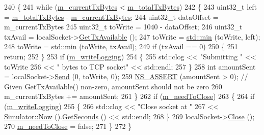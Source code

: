 \begin{DoxyCode}
240 \{
241   \textcolor{keywordflow}{while} (\hyperlink{classNs3TcpLossTestCase_a3ddd820ce273cb02ec0d500da76a88e2}{m\_currentTxBytes} < \hyperlink{classNs3TcpLossTestCase_ac06e95861fbb4ed79486d76a752a83d9}{m\_totalTxBytes})
242     \{
243       uint32\_t left = \hyperlink{classNs3TcpLossTestCase_ac06e95861fbb4ed79486d76a752a83d9}{m\_totalTxBytes} - \hyperlink{classNs3TcpLossTestCase_a3ddd820ce273cb02ec0d500da76a88e2}{m\_currentTxBytes};
244       uint32\_t dataOffset = m\_currentTxBytes %
245       uint32\_t toWrite = 1040 - dataOffset;
246       uint32\_t txAvail = localSocket->\hyperlink{classns3_1_1Socket_ae7cf62e3acf44106bfa1d40eaeaec151}{GetTxAvailable} ();
247       toWrite = \hyperlink{80211b_8c_ac6afabdc09a49a433ee19d8a9486056d}{std::min} (toWrite, left);
248       toWrite = \hyperlink{80211b_8c_ac6afabdc09a49a433ee19d8a9486056d}{std::min} (toWrite, txAvail);
249       \textcolor{keywordflow}{if} (txAvail == 0)
250         \{
251           \textcolor{keywordflow}{return};
252         \}
253       \textcolor{keywordflow}{if} (\hyperlink{classNs3TcpLossTestCase_a997665c1cf58a436a45b9e27766dd006}{m\_writeLogging})
254         \{
255           std::clog << \textcolor{stringliteral}{"Submitting "} << toWrite
256                     << \textcolor{stringliteral}{" bytes to TCP socket"} << std::endl;
257         \}
258       \textcolor{keywordtype}{int} amountSent = localSocket->\hyperlink{classns3_1_1Socket_a036901c8f485fe5b6eab93b7f2ec289d}{Send} (0, toWrite, 0);
259       \hyperlink{assert_8h_a6dccdb0de9b252f60088ce281c49d052}{NS\_ASSERT} (amountSent > 0);  \textcolor{comment}{// Given GetTxAvailable() non-zero, amountSent should not be
       zero}
260       m\_currentTxBytes += amountSent;
261     \}
262   \textcolor{keywordflow}{if} (\hyperlink{classNs3TcpLossTestCase_afdd4755f5e27da04bf3385eab1068495}{m\_needToClose})
263     \{
264       \textcolor{keywordflow}{if} (\hyperlink{classNs3TcpLossTestCase_a997665c1cf58a436a45b9e27766dd006}{m\_writeLogging})
265         \{
266           std::clog << \textcolor{stringliteral}{"Close socket at "}
267                     <<  \hyperlink{group__simulator_gac3635e2e87f7ce316c89290ee1b01d0d}{Simulator::Now} ().\hyperlink{classns3_1_1Time_a8f20d5c3b0902d7b4320982f340b57c8}{GetSeconds} () << std::endl;
268         \}
269       localSocket->\hyperlink{classns3_1_1Socket_abdac6e2498c5aa2963ef361d4200ddf3}{Close} ();
270       \hyperlink{classNs3TcpLossTestCase_afdd4755f5e27da04bf3385eab1068495}{m\_needToClose} = \textcolor{keyword}{false};
271     \}
272 \}
\end{DoxyCode}


